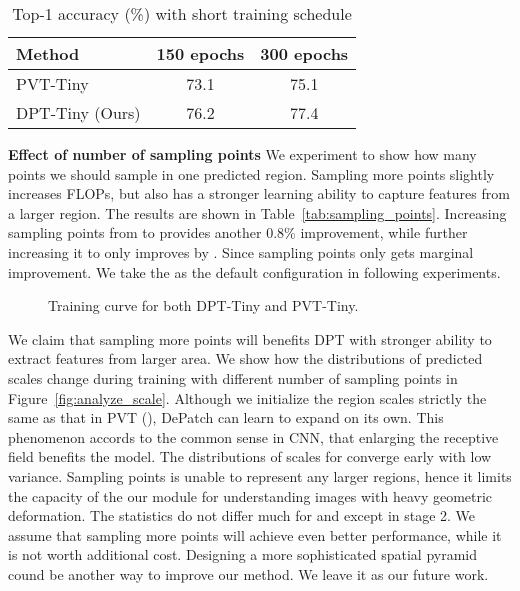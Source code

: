 \documentclass[sigconf,screen]{acmart}
\begin{document}
\begin{table}
  \caption{Top-1 accuracy (\%) with short training schedule}
  \label{tab:fast_train}
  \begin{tabular}{lcc}
    \toprule
    Method &  150 epochs & 300 epochs\\
    \midrule
    PVT-Tiny \cite{pvt} & 73.1 & 75.1\\
    DPT-Tiny (Ours)     & 76.2 & 77.4\\
  \bottomrule
\end{tabular}
\end{table}

\textbf{Effect of number of sampling points}
We experiment to show how many points we should sample in one predicted region. Sampling more points slightly increases FLOPs, but also has a stronger learning ability to capture features from a larger region. The results are shown in Table~\ref{tab:sampling_points}. Increasing sampling points from  to  provides another 0.8\% improvement, while further increasing it to  only improves by . Since sampling  points only gets marginal improvement. We take the  as the default configuration in following experiments.

\begin{figure}[h]
  \caption{Training curve for both DPT-Tiny and PVT-Tiny.}
  \label{fig:training_curve}
\end{figure}

We claim that sampling more points will benefits DPT with stronger ability to extract features from larger area. We show how the distributions of predicted scales change during training with different number of sampling points in Figure~\ref{fig:analyze_scale}. Although we initialize the region scales strictly the same as that in PVT (), DePatch can learn to expand on its own. This phenomenon accords to the common sense in CNN, that enlarging the receptive field benefits the model. The distributions of scales for  converge early with low variance. Sampling  points is unable to represent any larger regions, hence it limits the capacity of the our module for understanding images with heavy geometric deformation. The statistics do not differ much for  and  except in stage 2. We assume that sampling more points will achieve even better performance, while it is not worth additional cost. Designing a more sophisticated spatial pyramid cound be another way to improve our method. We leave it as our future work.
\end{document}
